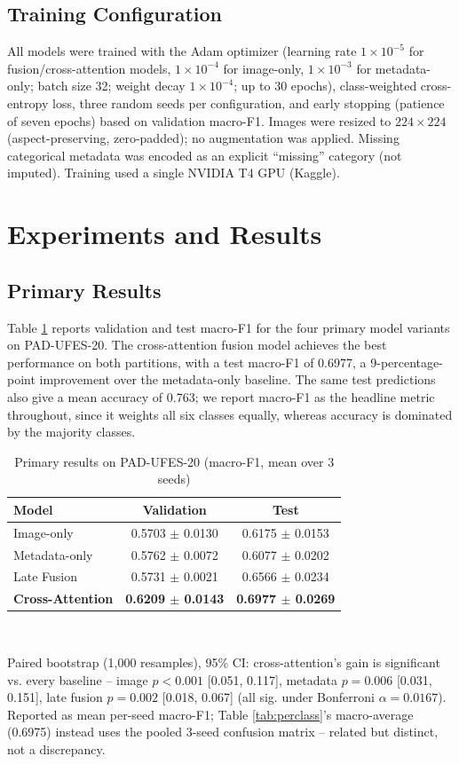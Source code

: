 \documentclass[conference]{IEEEtran}
\begin{document}
\subsection{Training Configuration}
All models were trained with the Adam optimizer (learning rate $1\times10^{-5}$ for fusion/cross-attention models, $1\times10^{-4}$ for image-only, $1\times10^{-3}$ for metadata-only; batch size 32; weight decay $1\times10^{-4}$; up to 30 epochs), class-weighted cross-entropy loss, three random seeds per configuration, and early stopping (patience of seven epochs) based on validation macro-F1. Images were resized to $224\times224$ (aspect-preserving, zero-padded); no augmentation was applied. Missing categorical metadata was encoded as an explicit ``missing'' category (not imputed). Training used a single NVIDIA T4 GPU (Kaggle).

\section{Experiments and Results}

\subsection{Primary Results}
Table \ref{tab:primary} reports validation and test macro-F1 for the four primary model variants on PAD-UFES-20. The cross-attention fusion model achieves the best performance on both partitions, with a test macro-F1 of 0.6977, a 9-percentage-point improvement over the metadata-only baseline. The same test predictions also give a mean accuracy of 0.763; we report macro-F1 as the headline metric throughout, since it weights all six classes equally, whereas accuracy is dominated by the majority classes.

\begin{table}[t]
\caption{Primary results on PAD-UFES-20 (macro-F1, mean over 3 seeds)}
\label{tab:primary}
\centering
\begin{tabular}{|l|c|c|}
\hline
\textbf{Model} & \textbf{Validation} & \textbf{Test} \\
\hline
Image-only & 0.5703 $\pm$ 0.0130 & 0.6175 $\pm$ 0.0153 \\
\hline
Metadata-only & 0.5762 $\pm$ 0.0072 & 0.6077 $\pm$ 0.0202 \\
\hline
Late Fusion & 0.5731 $\pm$ 0.0021 & 0.6566 $\pm$ 0.0234 \\
\hline
\textbf{Cross-Attention} & \textbf{0.6209 $\pm$ 0.0143} & \textbf{0.6977 $\pm$ 0.0269} \\
\hline
\end{tabular}
\\[2pt]
\raggedright{\scriptsize Paired bootstrap (1,000 resamples), 95\% CI: cross-attention's gain is significant vs. every baseline -- image $p<0.001$ [0.051, 0.117], metadata $p=0.006$ [0.031, 0.151], late fusion $p=0.002$ [0.018, 0.067] (all sig. under Bonferroni $\alpha=0.0167$). Reported as mean per-seed macro-F1; Table \ref{tab:perclass}'s macro-average (0.6975) instead uses the pooled 3-seed confusion matrix -- related but distinct, not a discrepancy.}
\end{table}
\end{document}

